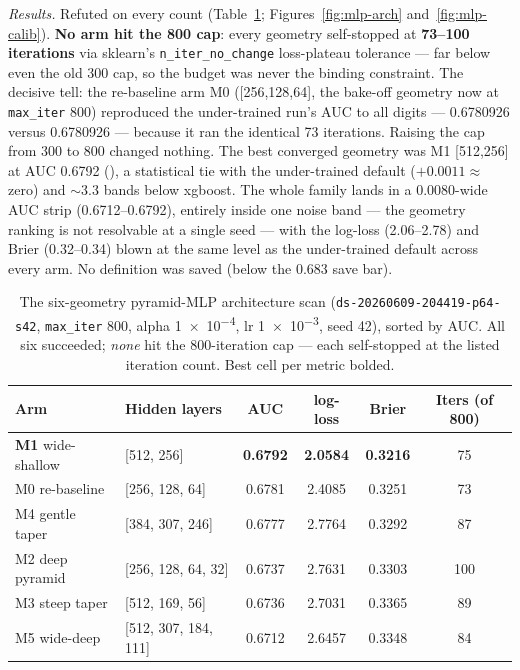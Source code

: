 \documentclass[11pt]{article}
\newcommand{\runid}[1]{\texttt{\small\seqsplit{#1}}}
\newcommand{\dsid}[1]{\texttt{\small #1}}
\newcommand{\best}[1]{\textbf{#1}}
\begin{document}
\emph{Results.} Refuted on every count (Table~\ref{tab:mlp-scan};
Figures~\ref{fig:mlp-arch} and~\ref{fig:mlp-calib}). \textbf{No arm hit the 800
cap}: every geometry self-stopped at \textbf{73--100 iterations} via sklearn's
\texttt{n\_iter\_no\_change} loss-plateau tolerance --- far below even the old
300 cap, so the budget was never the binding constraint. The decisive tell: the
re-baseline arm M0 ([256,128,64], the bake-off geometry now at \texttt{max\_iter}
800) reproduced the under-trained run's AUC to all digits ---
\num{0.6780926} versus \num{0.6780926} --- because it ran the identical 73
iterations. Raising the cap from 300 to 800 changed nothing. The best converged
geometry was M1 [512,256] at AUC \num{0.6792} (\runid{run-20260612-123155-0ace5}),
a statistical tie with the under-trained default ($+0.0011 \approx$ zero) and
$\sim$3.3 bands below xgboost. The whole family lands in a 0.0080-wide AUC strip
(0.6712--0.6792), entirely inside one noise band --- the geometry ranking is not
resolvable at a single seed --- with the log-loss (2.06--2.78) and Brier
(0.32--0.34) blown at the same level as the under-trained default across every
arm. No definition was saved (below the 0.683 save bar).

\begin{table}[ht]
  \centering
  \caption{The six-geometry pyramid-MLP architecture scan
  (\dsid{ds-20260609-204419-p64-s42}, \texttt{max\_iter} 800, alpha \num{1e-4},
  lr \num{1e-3}, seed 42), sorted by AUC. All six succeeded; \emph{none} hit
  the 800-iteration cap --- each self-stopped at the listed iteration count.
  Best cell per metric bolded.}
  \label{tab:mlp-scan}
  \begin{tabular}{llcccc}
    \toprule
    Arm & Hidden layers & AUC & log-loss & Brier & Iters (of 800) \\
    \midrule
    \best{M1} wide-shallow & [512, 256]            & \best{0.6792} & \best{2.0584} & \best{0.3216} & 75 \\
    M0 re-baseline         & [256, 128, 64]        & 0.6781 & 2.4085 & 0.3251 & 73 \\
    M4 gentle taper        & [384, 307, 246]       & 0.6777 & 2.7764 & 0.3292 & 87 \\
    M2 deep pyramid        & [256, 128, 64, 32]    & 0.6737 & 2.7631 & 0.3303 & 100 \\
    M3 steep taper         & [512, 169, 56]        & 0.6736 & 2.7031 & 0.3365 & 89 \\
    M5 wide-deep           & [512, 307, 184, 111]  & 0.6712 & 2.6457 & 0.3348 & 84 \\
    \bottomrule
  \end{tabular}
\end{table}
\end{document}
